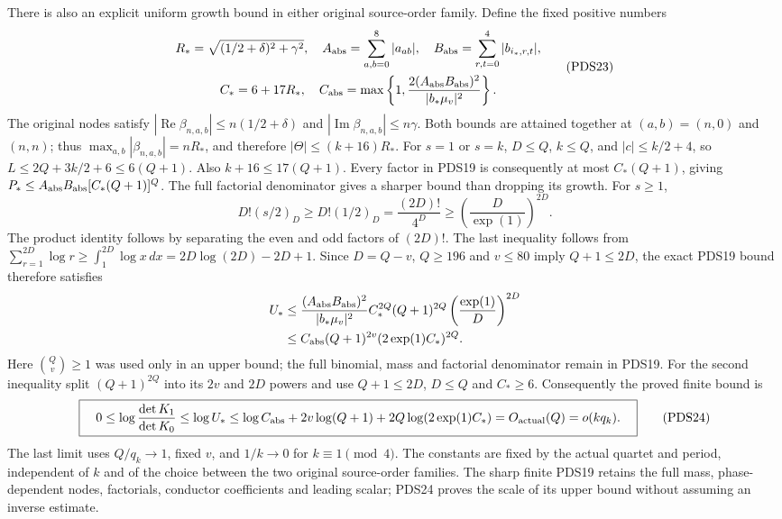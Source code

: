 \documentclass[10pt]{article}
\begin{document}
There is also an explicit uniform growth bound in either
original source-order family. Define the fixed positive numbers
\[
 \begin{gathered}
 R_* = \sqrt{(1/2+\delta)^2+\gamma^2},\quad
 A_{\rm abs}=\sum_{a,b=0}^8|a_{ab}|,\quad
 B_{\rm abs}=\sum_{r,t=0}^4|b_{i_*,r,t}|,\\
 C_*=6+17R_*,\quad
 C_{\rm abs}=\max\left\{1,\frac{2(A_{\rm abs}B_{\rm abs})^2}{|b_*\mu_v|^2}\right\}.
 \end{gathered}
\tag{PDS23}
\]
The original nodes satisfy
$|\operatorname{Re}\beta_{n,a,b}|\le n(1/2+\delta)$ and
$|\operatorname{Im}\beta_{n,a,b}|\le n\gamma$. Both bounds are
attained together at $(a,b)=(n,0)$ and $(n,n)$; thus
$\max_{a,b}|\beta_{n,a,b}|=nR_*$,
and therefore $|\Theta|\le(k+16)R_*$.
For $s=1$ or $s=k$, $D\le Q$, $k\le Q$, and
$|c|\le k/2+4$, so
$L\le 2Q+3k/2+6\le6(Q+1)$.
Also $k+16\le17(Q+1)$. Every factor in PDS19 is consequently
at most $C_*(Q+1)$, giving
$P_*\le A_{\rm abs}B_{\rm abs}[C_*(Q+1)]^Q$.
The full factorial denominator gives a sharper bound than
dropping its growth. For $s\ge1$,
\[
 D!(s/2)_D\ge D!(1/2)_D=\frac{(2D)!}{4^D}
                         \ge\left(\frac{D}{\exp(1)}\right)^{2D}.
\]
The product identity follows by separating the even and odd
factors of $(2D)!$. The last inequality follows from
$\sum_{r=1}^{2D}\log r\ge\int_1^{2D}\log x\,dx
=2D\log(2D)-2D+1$.
Since $D=Q-v$, $Q\ge196$ and $v\le80$ imply
$Q+1\le2D$, the exact PDS19 bound therefore satisfies
\[
 \begin{split}
 U_*&\le
 \frac{(A_{\rm abs}B_{\rm abs})^2}{|b_*\mu_v|^2}
 C_*^{2Q}(Q+1)^{2Q}
                \left(\frac{\exp(1)}D\right)^{2D}\\
 &\le C_{\rm abs}(Q+1)^{2v}
                         (2\exp(1)C_*)^{2Q}.
 \end{split}
\]
Here $\binom Qv\ge1$ was used only in an upper bound; the
full binomial, mass and factorial denominator remain in PDS19.
For the second inequality split $(Q+1)^{2Q}$ into its
$2v$ and $2D$ powers and use $Q+1\le2D$, $D\le Q$ and
$C_*\ge6$. Consequently the proved finite bound is
\[
 \boxed{\quad
 0\le\log\frac{\det K_1}{\det K_0}
 \le\log U_*
 \le\log C_{\rm abs}+2v\log(Q+1)
       +2Q\log(2\exp(1)C_*)
 =O_{\mathrm{actual}}(Q)=o(kq_k).
 \quad}\tag{PDS24}
\]
The last limit uses $Q/q_k\to1$, fixed $v$, and $1/k\to0$ for
$k\equiv1\pmod4$. The constants are fixed by the actual
quartet and period, independent of $k$ and of the choice between
the two original source-order families. The sharp finite PDS19
retains the full mass, phase-dependent nodes, factorials, conductor
coefficients and leading scalar; PDS24 proves the scale of its
upper bound without assuming an inverse estimate.
\end{document}
